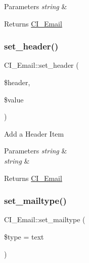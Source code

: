 \begin{DoxyParams}{Parameters}
{\em string} & \\
\hline
\end{DoxyParams}
\begin{DoxyReturn}{Returns}
\mbox{\hyperlink{class_c_i___email}{C\+I\+\_\+\+Email}} 
\end{DoxyReturn}
\mbox{\label{class_c_i___email_a0d30433cc57714fb2fb3d49b3587a40f}} 
\subsubsection{\texorpdfstring{set\+\_\+header()}{set\_header()}}
{\footnotesize\ttfamily C\+I\+\_\+\+Email\+::set\+\_\+header (\begin{DoxyParamCaption}\item[{}]{\$header,  }\item[{}]{\$value }\end{DoxyParamCaption})}

Add a Header Item


\begin{DoxyParams}{Parameters}
{\em string} & \\
\hline
{\em string} & \\
\hline
\end{DoxyParams}
\begin{DoxyReturn}{Returns}
\mbox{\hyperlink{class_c_i___email}{C\+I\+\_\+\+Email}} 
\end{DoxyReturn}
\mbox{\label{class_c_i___email_a7a1f80002a6575adda9436fd0fd85055}} 
\subsubsection{\texorpdfstring{set\+\_\+mailtype()}{set\_mailtype()}}
{\footnotesize\ttfamily C\+I\+\_\+\+Email\+::set\+\_\+mailtype (\begin{DoxyParamCaption}\item[{}]{\$type = {\ttfamily \textquotesingle{}text\textquotesingle{}} }\end{DoxyParamCaption})}

